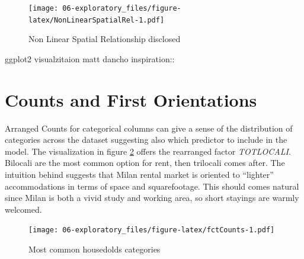 \documentclass[
  12pt,
  a4paper,
  oneside]{book}
\theoremstyle{definition}
\theoremstyle{definition}
\theoremstyle{definition}
\theoremstyle{remark}
\begin{document}
\begin{figure}
\centering
\texttt{[image: 06-exploratory\_files/figure-latex/NonLinearSpatialRel-1.pdf]}
\caption{\label{fig:NonLinearSpatialRel}Non Linear Spatial Relationship disclosed}
\end{figure}

ggplot2 visualzitaion matt dancho inspiration::

\hypertarget{counts-and-first-orientations}{%
\section{Counts and First Orientations}\label{counts-and-first-orientations}}

Arranged Counts for categorical columns can give a sense of the distribution of categories across the dataset suggesting also which predictor to include in the model. The visualization in figure \ref{fig:fctCounts} offers the rearranged factor \emph{TOTLOCALI}.
Bilocali are the most common option for rent, then trilocali comes after. The intuition behind suggests that Milan rental market is oriented to ``lighter'' accommodations in terms of space and squarefootage. This should comes natural since Milan is both a vivid study and working area, so short stayings are warmly welcomed.

\begin{figure}
\centering
\texttt{[image: 06-exploratory\_files/figure-latex/fctCounts-1.pdf]}
\caption{\label{fig:fctCounts}Most common housedolds categories}
\end{figure}
\end{document}
